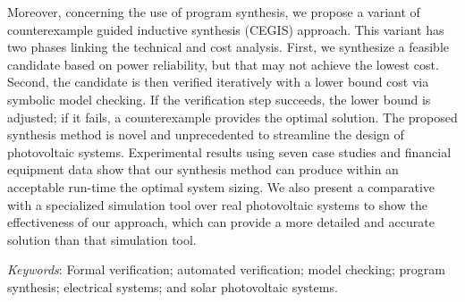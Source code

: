 Moreover, concerning the use of program synthesis, we propose a variant of counterexample guided inductive synthesis (CEGIS) approach. This variant has two phases linking the technical and cost analysis. First, we synthesize a feasible candidate based on power reliability, but that may not achieve the lowest cost. Second, the candidate is then verified iteratively with a lower bound cost via symbolic model checking. If the verification step succeeds, the lower bound is adjusted; if it fails, a counterexample provides the optimal solution. The proposed synthesis method is novel and unprecedented to streamline the design of photovoltaic systems. Experimental results using seven case studies and financial equipment data show that our synthesis method can produce within an acceptable run-time the optimal system sizing. We also present a comparative with a specialized simulation tool over real photovoltaic systems to show the effectiveness of our approach, which can provide a more detailed and accurate solution than that simulation tool.



\textit{Keywords}: Formal verification; automated verification; model checking; program synthesis; electrical systems; and solar photovoltaic systems.
